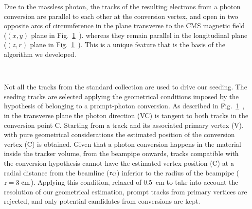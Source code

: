 \documentclass[a4paper]{jpconf}
\begin{document}
Due to the massless photon, the tracks of the resulting electrons from a photon conversion are parallel to each other at the conversion vertex, and open in two opposite arcs of circumference in the  plane transverse to the CMS magnetic field ($(x,y)$ plane in Fig.~\ref{fig:algo}~).
whereas they  remain parallel in the  longitudinal plane ($(z,r)$ plane in Fig.~\ref{fig:algo}~). This is a unique feature that is the basis of the algorithm we developed. 


\begin{figure}[]
\centering
{}
\caption{~}
\label{fig:algo}
\end{figure}

Not all the tracks from  the standard collection are used to drive our seeding. The seeding tracks are selected applying the geometrical conditions imposed by the hypothesis of belonging to a prompt-photon conversion. 
%
As described in Fig.~\ref{fig:algo}~, in the transverse plane the photon direction (VC) is tangent to both tracks in the conversion point C. Starting from a track and its associated primary vertex (V), with pure geometrical considerations the estimated position of the conversion vertex (C) is obtained. Given that a photon conversion happens in the material inside the tracker volume, from the beampipe onwards, tracks compatible with the conversion hypothesis cannot have the estimated vertex position (C) at a radial distance from the beamline ($\rm r_C$) inferior to the radius of the beampipe ($\rm r=3~cm$). Applying this condition, relaxed of 0.5~cm to take into account the resolution of our geometrical estimation,  prompt tracks from primary vertices are rejected, and only potential candidates from conversions are kept.
\end{document}
